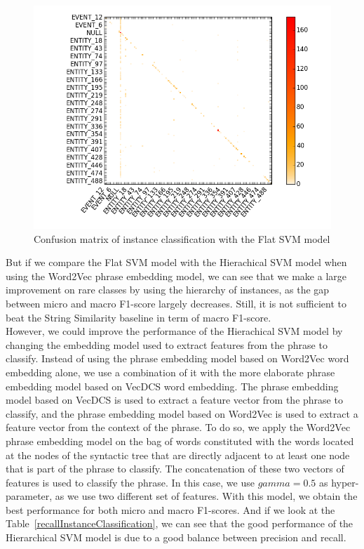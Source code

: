 \documentclass[12pt]{article}
\begin{document}
\begin{figure}[!ht]
   \centering \includegraphics[width=0.8\linewidth]{Figures/Confusion_Matrices/confusionMatrixInstanceClassificationGlobal_flat.png}
   \caption{\label{flatConfusion} Confusion matrix of instance classification with the Flat SVM model}
\end{figure}

But if we compare the Flat SVM model with the Hierachical SVM model when using the Word2Vec phrase embedding model, we can see that we make a large improvement on rare classes by using the hierarchy of instances, as the gap between micro and macro F1-score largely decreases. Still, it is not sufficient to beat the String Similarity baseline in term of macro F1-score.\\
However, we could improve the performance of the Hierachical SVM model by changing the embedding model used to extract features from the phrase to classify. Instead of using the phrase embedding model based on Word2Vec word embedding alone, we use a combination of it with the more elaborate phrase embedding model based on VecDCS word embedding. The phrase embedding model based on VecDCS is used to extract a feature vector from the phrase to classify, and the phrase embedding model based on Word2Vec is used to extract a feature vector from the context of the phrase. To do so, we apply the Word2Vec phrase embedding model on the bag of words constituted with the words located at the nodes of the syntactic tree that are directly adjacent to at least one node that is part of the phrase to classify. The concatenation of these two vectors of features is used to classify the phrase. In this case, we use $gamma=0.5$ as hyper-parameter, as we use two different set of features. With this model, we obtain the best performance for both micro and macro F1-scores. And if we look at the Table~\ref{recallInstanceClassification}, we can see that the good performance of the Hierarchical SVM model is due to a good balance between precision and recall.
\end{document}

